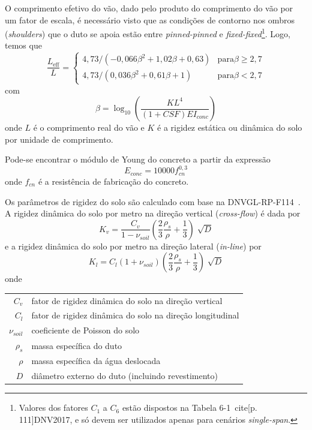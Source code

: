 O comprimento efetivo do vão, dado pelo produto do comprimento do vão por um fator de escala, é necessário visto que as condições de contorno nos ombros (\textit{shoulders}) que o duto se apoia estão entre \textit{pinned-pinned} e \textit{fixed-fixed}\footnote{Valores dos fatores $C_1$ a $C_6$ estão dispostos na Tabela 6-1~cite[p. 111]{DNV2017}, e só devem ser utilizados apenas para cenários \textit{single-span}.}.
Logo, temos que
\begin{equation}
\label{eq:viv-LeffL}
\frac{L_\mathrm{eff}}{L} =
\begin{cases}
	4,73 / (-0,066 \beta^2 + 1,02 \beta + 0,63)   & \mathrm{para} \beta \geq 2,7 \\
	4,73 / (0,036 \beta^2 + 0,61 \beta + 1)       & \mathrm{para} \beta <    2,7
\end{cases}
\end{equation}
com
\begin{equation}
\label{eq:viv-beta}
\beta = \log_{10}\left( \frac{K L^4}{(1 + \mathit{CSF})\mathit{EI}_\mathit{conc}} \right)
\end{equation}
onde $L$ é o comprimento real do vão e $K$ é a rigidez estática ou dinâmica do solo por unidade de comprimento.

Pode-se encontrar o módulo de Young do concreto a partir da expressão
\begin{equation}
\label{eq:viv-Econc}
E_\mathit{conc} = 10000 f_\mathit{cn}^{0,3}
\end{equation}
onde $f_\mathit{cn}$ é a resistência de fabricação do concreto.

Os parâmetros de rigidez do solo são calculado com base na DNVGL-RP-F114~\cite{DNVF114}.
A rigidez dinâmica do solo por metro na direção vertical (\textit{cross-flow}) é dada por
\begin{equation}
\label{eq:viv-Kv}
K_v = \frac{C_v}{1 - \nu_\mathit{soil}}\left(\frac{2}{3}\frac{\rho_s}{\rho}+\frac{1}{3}\right)\sqrt[]{D}
\end{equation}
e a rigidez dinâmica do solo por metro na direção lateral (\textit{in-line}) por
\begin{equation}
\label{eq:viv-Kl}
K_l = C_l (1+\nu_\mathit{soil})\left(\frac{2}{3}\frac{\rho_s}{\rho}+ \frac{1}{3}\right)\sqrt[]{D}
\end{equation}
onde

\begin{tabular}{rl}
	$C_v$               & fator de rigidez dinâmica do solo na direção vertical\\
	$C_l$               & fator de rigidez dinâmica do solo na direção longitudinal\\
	$\nu_\mathit{soil}$ & coeficiente de Poisson do solo\\
	$\rho_s$            & massa específica do duto\\
	$\rho$              & massa específica da água deslocada\\
	$D$                 & diâmetro externo do duto (incluindo revestimento)
\end{tabular}

